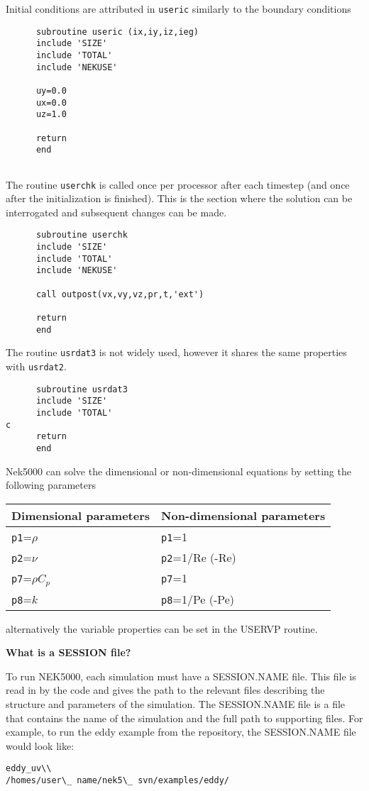 Initial conditions are attributed in {\tt useric} similarly to the boundary conditions
\begin{lstlisting}
      subroutine useric (ix,iy,iz,ieg)
      include 'SIZE'
      include 'TOTAL'
      include 'NEKUSE'
   
      uy=0.0
      ux=0.0
      uz=1.0

      return
      end
      
\end{lstlisting}
The routine {\tt userchk} is called once per processor after each timestep (and once after the initialization is finished). This is the section where the solution can be interrogated and subsequent changes can be made.
\begin{lstlisting}
      subroutine userchk
      include 'SIZE'
      include 'TOTAL'
      include 'NEKUSE'

      call outpost(vx,vy,vz,pr,t,'ext')
           
      return
      end
      \end{lstlisting}
      
The routine {\tt usrdat3} is not widely used, however it shares the same properties with {\tt usrdat2}.
\begin{lstlisting}
      subroutine usrdat3
      include 'SIZE'
      include 'TOTAL'
c
      return
      end
\end{lstlisting}

Nek5000 can solve the dimensional or non-dimensional equations by setting the following parameters

\begin{table}

\begin{tabular}{ l|l| }
   \hline
   Dimensional parameters & Non-dimensional parameters\\ \hline \hline
{\tt p1}=\(\rho\)      &      {\tt p1}=1\\
{\tt p2}=\(\nu\)       &      {\tt p2}=1/Re (-Re)\\
{\tt p7}=\(\rho C_p\)  &      {\tt p7}=1\\
{\tt p8}=\(k\)         &      {\tt p8}=1/Pe (-Pe)\\
   \hline
\end{tabular}
\end{table}

alternatively the variable properties can be set in the USERVP routine.

 
\textbf{What is a SESSION file?}

To run NEK5000, each simulation must have a SESSION.NAME file. This file is read in by the code and gives the path to the relevant files describing the structure and parameters of the simulation. The SESSION.NAME file is a file that contains the name of the simulation and the full path to supporting files. For example, to run the eddy example from the repository, the SESSION.NAME file would look like:

\begin{verbatim}
eddy_uv\\
/homes/user\_ name/nek5\_ svn/examples/eddy/ 
\end{verbatim}

